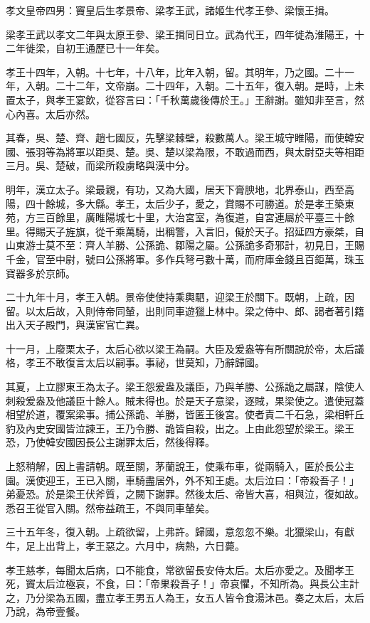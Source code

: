 
\begin{pinyinscope}
孝文皇帝四男：竇皇后生孝景帝、梁孝王武，諸姬生代孝王參、梁懷王揖。

梁孝王武以孝文二年與太原王參、梁王揖同日立。武為代王，四年徙為淮陽王，十二年徙梁，自初王通歷已十一年矣。

孝王十四年，入朝。十七年，十八年，比年入朝，留。其明年，乃之國。二十一年，入朝。二十二年，文帝崩。二十四年，入朝。二十五年，復入朝。是時，上未置太子，與孝王宴飲，從容言曰：「千秋萬歲後傳於王。」王辭謝。雖知非至言，然心內喜。太后亦然。

其春，吳、楚、齊、趙七國反，先擊梁棘壁，殺數萬人。梁王城守睢陽，而使韓安國、張羽等為將軍以距吳、楚。吳、楚以梁為限，不敢過而西，與太尉亞夫等相距三月。吳、楚破，而梁所殺虜略與漢中分。

明年，漢立太子。梁最親，有功，又為大國，居天下膏腴地，北界泰山，西至高陽，四十餘城，多大縣。孝王，太后少子，愛之，賞賜不可勝道。於是孝王築東苑，方三百餘里，廣睢陽城七十里，大治宮室，為復道，自宮連屬於平臺三十餘里。得賜天子旌旗，從千乘萬騎，出稱警，入言旧，儗於天子。招延四方豪桀，自山東游士莫不至：齊人羊勝、公孫詭、鄒陽之屬。公孫詭多奇邪計，初見日，王賜千金，官至中尉，號曰公孫將軍。多作兵弩弓數十萬，而府庫金錢且百鉅萬，珠玉寶器多於京師。

二十九年十月，孝王入朝。景帝使使持乘輿駟，迎梁王於關下。既朝，上疏，因留。以太后故，入則侍帝同輦，出則同車遊獵上林中。梁之侍中、郎、謁者著引籍出入天子殿門，與漢宦官亡異。

十一月，上廢栗太子，太后心欲以梁王為嗣。大臣及爰盎等有所關說於帝，太后議格，孝王不敢復言太后以嗣事。事祕，世莫知，乃辭歸國。

其夏，上立膠東王為太子。梁王怨爰盎及議臣，乃與羊勝、公孫詭之屬謀，陰使人刺殺爰盎及他議臣十餘人。賊未得也。於是天子意梁，逐賊，果梁使之。遣使冠蓋相望於道，覆案梁事。捕公孫詭、羊勝，皆匿王後宮。使者責二千石急，梁相軒丘豹及內史安國皆泣諫王，王乃令勝、詭皆自殺，出之。上由此怨望於梁王。梁王恐，乃使韓安國因長公主謝罪太后，然後得釋。

上怒稍解，因上書請朝。既至關，茅蘭說王，使乘布車，從兩騎入，匿於長公主園。漢使迎王，王已入關，車騎盡居外，外不知王處。太后泣曰：「帝殺吾子！」弟憂恐。於是梁王伏斧質，之闕下謝罪。然後太后、帝皆大喜，相與泣，復如故。悉召王從官入關。然帝益疏王，不與同車輦矣。

三十五年冬，復入朝。上疏欲留，上弗許。歸國，意忽忽不樂。北獵梁山，有獻牛，足上出背上，孝王惡之。六月中，病熱，六日薨。

孝王慈孝，每聞太后病，口不能食，常欲留長安侍太后。太后亦愛之。及聞孝王死，竇太后泣極哀，不食，曰：「帝果殺吾子！」帝哀懼，不知所為。與長公主計之，乃分梁為五國，盡立孝王男五人為王，女五人皆令食湯沐邑。奏之太后，太后乃說，為帝壹餐。


\end{pinyinscope}

